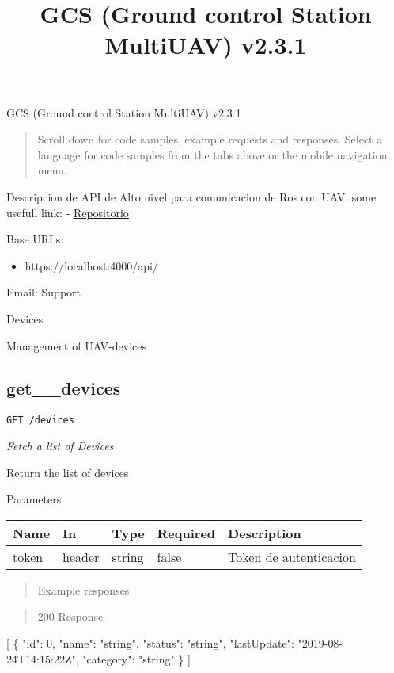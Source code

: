 \documentclass[
]{article}
\title{GCS (Ground control Station MultiUAV) v2.3.1}
\author{}
\date{}
\newenvironment{Shaded}{}{}
\newcommand{\DataTypeTok}[1]{\textcolor[rgb]{0.56,0.13,0.00}{#1}}
\newcommand{\DecValTok}[1]{\textcolor[rgb]{0.25,0.63,0.44}{#1}}
\newcommand{\FunctionTok}[1]{\textcolor[rgb]{0.02,0.16,0.49}{#1}}
\newcommand{\OtherTok}[1]{\textcolor[rgb]{0.00,0.44,0.13}{#1}}
\newcommand{\StringTok}[1]{\textcolor[rgb]{0.25,0.44,0.63}{#1}}
\providecommand{\tightlist}{%
  \setlength{\itemsep}{0pt}\setlength{\parskip}{0pt}}
\begin{document}
\maketitle

GCS (Ground control Station MultiUAV) v2.3.1

\begin{quote}
Scroll down for code samples, example requests and responses. Select a
language for code samples from the tabs above or the mobile navigation
menu.
\end{quote}

Descripcion de API de Alto nivel para comunicacion de Ros con UAV. some
usefull link: -
\href{https://github.com/alvcaballero/multiuav_gui/tree/react}{Repositorio}

Base URLs:

\begin{itemize}
\tightlist
\item
  https://localhost:4000/api/
\end{itemize}

Email: Support

Devices

Management of UAV-devices

\hypertarget{get__devices}{%
\subsection{get\_\_devices}\label{get__devices}}

\texttt{GET\ /devices}

\emph{Fetch a list of Devices}

Return the list of devices

Parameters

\begin{longtable}[]{@{}lllll@{}}
\toprule
Name & In & Type & Required & Description\tabularnewline
\midrule
\endhead
token & header & string & false & Token de autenticacion\tabularnewline
\bottomrule
\end{longtable}

\begin{quote}
Example responses
\end{quote}

\begin{quote}
200 Response
\end{quote}

\begin{Shaded}
\begin{Highlighting}[]
\OtherTok{[}
  \FunctionTok{\{}
    \DataTypeTok{"id"}\FunctionTok{:} \DecValTok{0}\FunctionTok{,}
    \DataTypeTok{"name"}\FunctionTok{:} \StringTok{"string"}\FunctionTok{,}
    \DataTypeTok{"status"}\FunctionTok{:} \StringTok{"string"}\FunctionTok{,}
    \DataTypeTok{"lastUpdate"}\FunctionTok{:} \StringTok{"2019{-}08{-}24T14:15:22Z"}\FunctionTok{,}
    \DataTypeTok{"category"}\FunctionTok{:} \StringTok{"string"}
  \FunctionTok{\}}
\OtherTok{]}
\end{Highlighting}
\end{Shaded}
\end{document}
